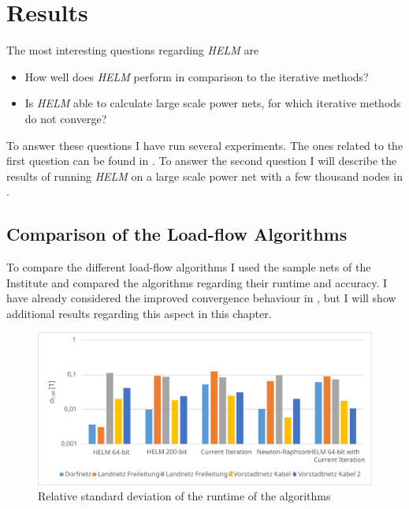 \chapter{Results}
\label{sec:results}
The most interesting questions regarding \emph{HELM} are
\begin{itemize}
	\item How well does \emph{HELM} perform in comparison to the iterative methods?
	\item Is \emph{HELM} able to calculate large scale power nets, for which iterative methods do not converge?
\end{itemize}
To answer these questions I have run several experiments. The ones related to the first question can be found in . To answer the second question I will describe the results of running \emph{HELM} on a large scale power net with a few thousand nodes in .

\section{Comparison of the Load-flow Algorithms}
\label{sec:comparison_algorithms}

To compare the different load-flow algorithms I used the sample nets of the Institute and compared the algorithms regarding their runtime and accuracy. I have already considered the improved convergence behaviour in , but I will show additional results regarding this aspect in this chapter.

\begin{figure}[hb]
	\centering
	\includegraphics[scale=0.7]{figures/comparison_deviation}
	\caption[Comparison, relative standard deviation of runtime]{Relative standard deviation of the runtime of the algorithms}
	\label{fig:comparison_deviation}
\end{figure}

